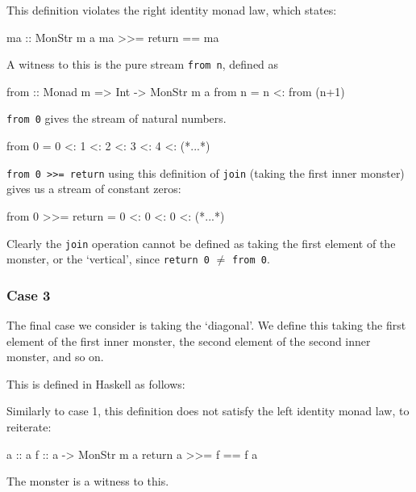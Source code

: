 This definition violates the right identity monad law, which states:
\begin{haskell}
ma :: MonStr m a
ma >>= return == ma
\end{haskell}

A witness to this is the pure stream \verb+from n+, defined as
\begin{haskell}
from :: Monad m => Int -> MonStr m a 
from n = n <: from (n+1)
\end{haskell}

\verb+from 0+ gives the stream of natural numbers.
\begin{haskell}
from 0 = 0 <: 1 <: 2 <: 3 <: 4 <: (*...*)
\end{haskell}

\verb+from 0 >>= return+ using this definition of \verb+join+ (taking the first inner monster) gives us a stream of constant zeros:
\begin{haskell}
from 0 >>= return = 0 <: 0 <: 0 <: (*...*)
\end{haskell}

Clearly the \verb+join+ operation cannot be defined as taking the first element of the monster, or the `vertical', since \verb+return 0+ $\neq$ \verb+from 0+.


\subsubsection{Case 3}

The final case we consider is taking the `diagonal'. We define this taking the first element of the first inner monster, the second element of the second inner monster, and so on.

This is defined in Haskell as follows:

Similarly to case 1, this definition does not satisfy the left identity monad law, to reiterate:
\begin{haskell}
a :: a
f :: a -> MonStr m a
return a >>= f == f a
\end{haskell} 

The monster  is a witness to this.

